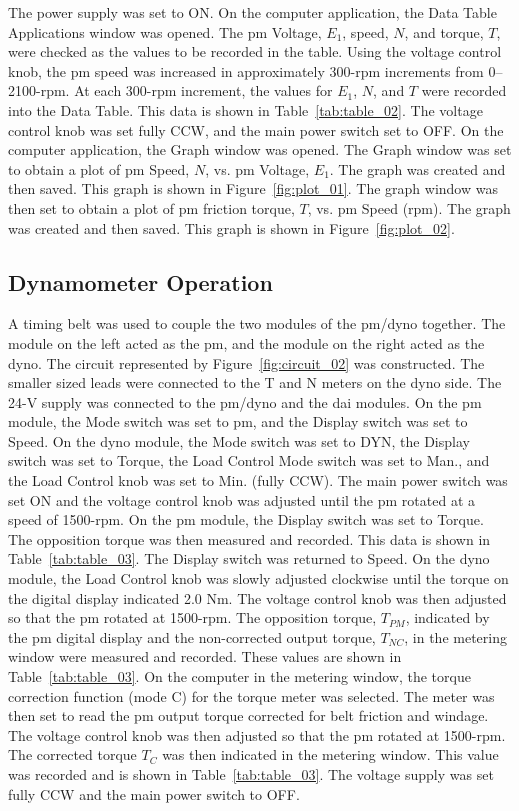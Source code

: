 \documentclass{article}
\begin{document}
The power supply was set to {ON}. On the computer application, the Data Table
Applications window was opened. The \gls{pm} Voltage, $E_1$, speed, $N$, and
torque, $T$, were checked as the values to be recorded in the table. Using the
voltage control knob, the \gls{pm} speed was increased in approximately 300-rpm
increments from 0--2100-rpm. At each 300-rpm increment, the values for $E_1$,
$N$, and $T$ were recorded into the Data Table. This data is shown in
Table~\ref{tab:table_02}. The voltage control knob was set fully CCW, and the
main power switch set to {OFF}. On the computer application, the Graph window
was opened. The Graph window was set to obtain a plot of \gls{pm} Speed, $N$,
vs.  \gls{pm} Voltage, $E_1$. The graph was created and then saved.  This graph
is shown in Figure~\ref{fig:plot_01}. The graph window was then set to obtain a
plot of \gls{pm} friction torque, $T$, vs. \gls{pm} Speed (rpm). The graph was
created and then saved. This graph is shown in Figure~\ref{fig:plot_02}.

\subsection{Dynamometer Operation}

\label{part2} A timing belt was used to couple the two modules of the
\gls{pm}/\gls{dyno} together. The module on the left acted as the \gls{pm}, and
the module on the right acted as the \gls{dyno}. The circuit represented by
Figure~\ref{fig:circuit_02} was constructed. The smaller sized leads were
connected to the T and N meters on the \gls{dyno} side. The 24-V supply was
connected to the \gls{pm}/\gls{dyno} and the \gls{dai} modules. On the \gls{pm}
module, the Mode switch was set to \gls{pm}, and the Display switch was set to
Speed. On the \gls{dyno} module, the Mode switch was set to DYN, the Display
switch was set to Torque, the Load Control Mode switch was set to Man., and the
Load Control knob was set to Min. (fully CCW). The main power switch was set ON
and the voltage control knob was adjusted until the \gls{pm} rotated at a speed
of 1500-rpm. On the \gls{pm} module, the Display switch was set to Torque.  The
opposition torque was then measured and recorded. This data is shown in
Table~\ref{tab:table_03}. The Display switch was returned to Speed. On the
\gls{dyno} module, the Load Control knob was slowly adjusted clockwise until
the torque on the digital display indicated 2.0 Nm. The voltage control knob
was then adjusted so that the \gls{pm} rotated at 1500-rpm. The opposition
torque, $T_{PM}$, indicated by the \gls{pm} digital display and the
non-corrected output torque, $T_{NC}$, in the metering window were measured and
recorded. These values are shown in Table~\ref{tab:table_03}. On the computer
in the metering window, the torque correction function (mode C) for the torque
meter was selected. The meter was then set to read the \gls{pm} output torque
corrected for belt friction and windage. The voltage control knob was then
adjusted so that the \gls{pm} rotated at 1500-rpm.  The corrected torque $T_C$
was then indicated in the metering window. This value was recorded and is shown
in Table~\ref{tab:table_03}. The voltage supply was set fully CCW and the main
power switch to OFF.
\end{document}

